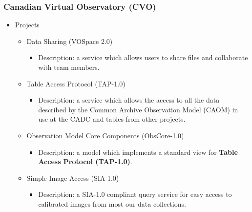 \documentclass[11pt]{article}
\begin{document}
              \subsubsection{Canadian Virtual Observatory (CVO)}
                  \begin{itemize}
                      \item Projects
                          \begin{itemize}
                              \item Data Sharing (VOSpace 2.0)
                                  \begin{itemize}
                                      \item Description: a service which allows
users to share files and collaborate with team members.  
                                  \end{itemize}
                              \item Table Access Protocol (TAP-1.0)
                                  \begin{itemize}
                                      \item Description: a service which allows
the access to all the data described by the Common Archive Observation Model
(CAOM) in use at the CADC and tables from other projects.
                                  \end{itemize}
                              \item Observation Model Core Components
(ObsCore-1.0)
                                  \begin{itemize}
                                      \item Description: a model which
implements a standard view for \textbf{Table Access Protocol (TAP-1.0)}.
                                  \end{itemize}
                              \item Simple Image Access (SIA-1.0)
                                  \begin{itemize}
                                      \item Description: a SIA-1.0 compliant
query service for easy access to calibrated images from most our data
collections.
                                  \end{itemize}
                          \end{itemize}
                  \end{itemize}
\end{document}
